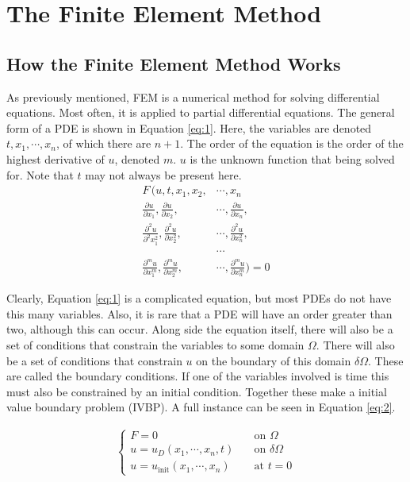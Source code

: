 \pagebreak

\section{The Finite Element Method}

\subsection{How the Finite Element Method Works} \label{subsection:1.2.1}

As previously mentioned, FEM is a numerical method for solving differential equations. Most often, it is applied to partial differential equations. The general form of a PDE is shown in Equation \ref{eq:1}. Here, the variables are denoted $t, x_1, \cdots, x_n$, of which there are $n+1$. The order of the equation is the order of the highest derivative of $u$, denoted $m$. $u$ is the unknown function that being solved for. Note that $t$ may not always be present here.
\begin{align}\label{eq:1}
F \, \Big(u, t, x_1, x_2, &\cdots, x_n \nonumber \\
\frac{\partial u}{\partial x_1}, \frac{\partial u}{\partial x_2}, &\cdots, \frac{\partial u}{\partial x_n}, \nonumber \\ 
\frac{\partial^2 u}{\partial^2 x^2_1}, \frac{\partial^2 u}{\partial x^2_2}, &\cdots, \frac{\partial^2 u}{\partial x_n^2}, \\
&\cdots \nonumber \\
\frac{\partial^m u}{\partial x^m_1}, \frac{\partial^m u}{\partial x^m_2}, &\cdots, \frac{\partial^m u}{\partial x_n^m} \Big)= 0\nonumber
\end{align}

Clearly, Equation \ref{eq:1} is a complicated equation, but most PDEs do not have this many variables. Also, it is rare that a PDE will have an order greater than two, although this can occur. Along side the equation itself, there will also be a set of conditions that constrain the variables to some domain $\Omega$. There will also be a set of conditions that constrain $u$ on the boundary of this domain $\delta \Omega$. These are called the boundary conditions. If one of the variables involved is time this must also be constrained by an initial condition. Together these make a initial value boundary problem (IVBP). A full instance can be seen in Equation \ref{eq:2}.

\begin{align}
\begin{cases} 
F=0 \quad &\text{on } \Omega \\
u = u_D(x_1, \cdots, x_n, t) \quad &\text{on } \delta\Omega \label{eq:2} \\
u = u_{\text{init}}(x_1, \cdots, x_n) \quad &\text{at } t=0
\end{cases}
\end{align}

